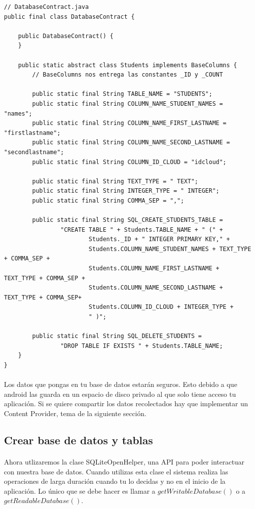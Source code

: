 \documentclass[10pt]{extarticle}
\begin{document}
\begin{lstlisting}
// DatabaseContract.java
public final class DatabaseContract {

    public DatabaseContract() {
    }

    public static abstract class Students implements BaseColumns {
		// BaseColumns nos entrega las constantes _ID y _COUNT
		
        public static final String TABLE_NAME = "STUDENTS";
        public static final String COLUMN_NAME_STUDENT_NAMES = "names";
        public static final String COLUMN_NAME_FIRST_LASTNAME = "firstlastname";
        public static final String COLUMN_NAME_SECOND_LASTNAME = "secondlastname";
        public static final String COLUMN_ID_CLOUD = "idcloud";

        public static final String TEXT_TYPE = " TEXT";
        public static final String INTEGER_TYPE = " INTEGER";
        public static final String COMMA_SEP = ",";

        public static final String SQL_CREATE_STUDENTS_TABLE =
                "CREATE TABLE " + Students.TABLE_NAME + " (" +
                        Students._ID + " INTEGER PRIMARY KEY," +
                        Students.COLUMN_NAME_STUDENT_NAMES + TEXT_TYPE + COMMA_SEP +
                        Students.COLUMN_NAME_FIRST_LASTNAME + TEXT_TYPE + COMMA_SEP +
                        Students.COLUMN_NAME_SECOND_LASTNAME + TEXT_TYPE + COMMA_SEP+
                        Students.COLUMN_ID_CLOUD + INTEGER_TYPE +
                        " )";

        public static final String SQL_DELETE_STUDENTS =
                "DROP TABLE IF EXISTS " + Students.TABLE_NAME;
    }
}
\end{lstlisting}

\paragraph{}
Los datos que pongas en tu base de datos estarán seguros. Esto debido a que android las guarda en un espacio de disco privado al que solo tiene acceso tu aplicación. Si se quiere compartir los datos recolectados hay que implementar un Content Provider, tema de la siguiente sección.

\subsection{Crear base de datos y tablas}

\paragraph{}
Ahora utlizaremos la clase SQLiteOpenHelper, una API para poder interactuar con nuestra base de datos. Cuando utilizas esta clase el sistema realiza las operaciones de larga duración cuando tu lo decidas y no en el inicio de la aplicación. Lo único que se debe hacer es llamar a $getWritableDatabase()$ o a $getReadableDatabase()$. 
\end{document}
